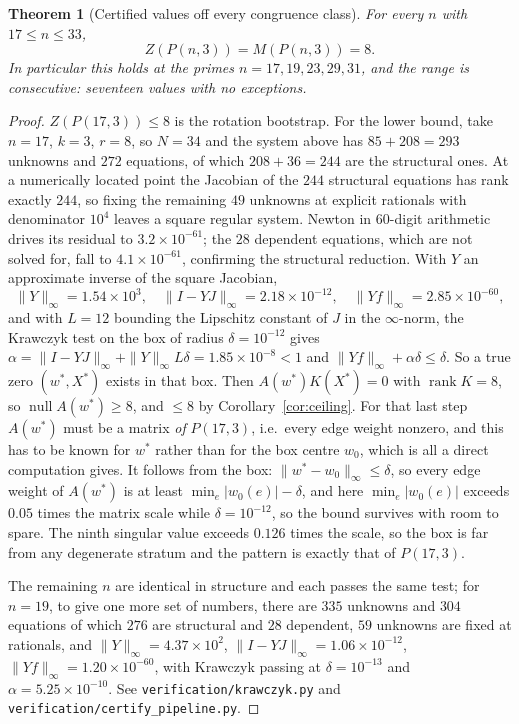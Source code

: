 \documentclass[11pt]{article}
\newtheorem{theorem}{Theorem}
\theoremstyle{definition}
\begin{document}
\begin{theorem}[Certified values off every congruence class]\label{thm:p17}
For every $n$ with $17\le n\le33$,
\[
  Z(P(n,3))=M(P(n,3))=8 .
\]
In particular this holds at the primes $n=17,19,23,29,31$, and the range is
consecutive: seventeen values with no exceptions.
\end{theorem}

\begin{proof}
$Z(P(17,3))\le8$ is the rotation bootstrap. For the lower bound, take
$n=17$, $k=3$, $r=8$, so $N=34$ and the system above has $85+208=293$ unknowns
and $272$ equations, of which $208+36=244$ are the structural ones. At a
numerically located point the Jacobian of the $244$ structural equations has
rank exactly $244$, so fixing the remaining $49$ unknowns at explicit rationals
with denominator $10^{4}$ leaves a square regular system. Newton in $60$-digit
arithmetic drives its residual to $3.2\times10^{-61}$; the $28$ dependent
equations, which are not solved for, fall to $4.1\times10^{-61}$, confirming the
structural reduction. With $Y$ an approximate inverse of the square Jacobian,
\[
  \|Y\|_\infty=1.54\times10^{3},\quad
  \|I-YJ\|_\infty=2.18\times10^{-12},\quad
  \|Yf\|_\infty=2.85\times10^{-60},
\]
and with $L=12$ bounding the Lipschitz constant of $J$ in the $\infty$-norm, the
Krawczyk test on the box of radius $\delta=10^{-12}$ gives
$\alpha=\|I-YJ\|_\infty+\|Y\|_\infty L\delta=1.85\times10^{-8}<1$ and
$\|Yf\|_\infty+\alpha\delta\le\delta$. So a true zero $(w^\ast,X^\ast)$ exists in
that box. Then $A(w^\ast)K(X^\ast)=0$ with $\operatorname{rank}K=8$, so
$\operatorname{null}A(w^\ast)\ge8$, and $\le8$ by
Corollary~\ref{cor:ceiling}. For that last step $A(w^\ast)$ must be a matrix
\emph{of} $P(17,3)$, i.e.\ every edge weight nonzero, and this has to be known
for $w^\ast$ rather than for the box centre $w_0$, which is all a direct
computation gives. It follows from the box: $\|w^\ast-w_0\|_\infty\le\delta$, so
every edge weight of $A(w^\ast)$ is at least $\min_e|w_0(e)|-\delta$, and here
$\min_e|w_0(e)|$ exceeds $0.05$ times the matrix scale while
$\delta=10^{-12}$, so the bound survives with room to spare. The ninth singular
value exceeds $0.126$ times the scale, so the box is far from any degenerate
stratum and the pattern is exactly that of $P(17,3)$.

The remaining $n$ are identical in structure and each passes the same
test; for $n=19$, to give one more set of numbers, there are $335$ unknowns and
$304$ equations of which $276$ are structural and $28$ dependent, $59$ unknowns
are fixed at rationals, and
$\|Y\|_\infty=4.37\times10^{2}$, $\|I-YJ\|_\infty=1.06\times10^{-12}$,
$\|Yf\|_\infty=1.20\times10^{-60}$, with Krawczyk passing at $\delta=10^{-13}$
and $\alpha=5.25\times10^{-10}$. See \texttt{verification/krawczyk.py} and
\texttt{verification/certify\_pipeline.py}.
\end{proof}
\end{document}

